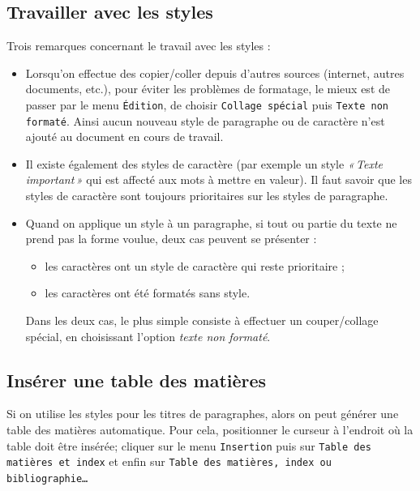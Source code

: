 \subsection{Travailler avec les styles}\label{Texte3travaillerStyle}

Trois remarques concernant le travail avec les styles :

\begin{itemize}
\vspace{8pt}\item Lorsqu'on effectue des copier/coller depuis d'autres sources (internet, autres documents, etc.), pour éviter les problèmes de formatage, le mieux est de passer par le menu \texttt{Édition}, de choisir \texttt{Collage spécial} puis \texttt{Texte non formaté}. Ainsi aucun nouveau style de paragraphe ou de caractère n'est ajouté au document en cours de travail.
\vspace{8pt}\item Il existe également des styles de caractère (par exemple un style \emph{«\,Texte important\,»} qui est affecté aux mots à mettre en valeur). Il faut savoir que les styles de caractère sont toujours prioritaires sur les styles de paragraphe.
\vspace{8pt}\item Quand on applique un style à un paragraphe, si tout ou partie du texte ne prend pas la forme voulue, deux cas peuvent se présenter :
    \begin{itemize}
    \item les caractères ont un style de caractère qui reste prioritaire ;
    \item les caractères ont été formatés sans style.
    \end{itemize}
Dans les deux cas, le plus simple consiste à effectuer un couper/collage spécial, en choisissant l'option \emph{texte non formaté}.
\end{itemize}


\subsection{Insérer une table des matières}\label{Texte3tableMatiere}

Si on utilise les styles pour les titres de paragraphes, alors on peut générer une table des matières automatique. Pour cela, positionner le curseur à l'endroit où la table doit être insérée; cliquer sur le menu \texttt{Insertion} puis sur \texttt{Table des matières et index} et enfin sur \texttt{Table des matières, index ou bibliographie…}

